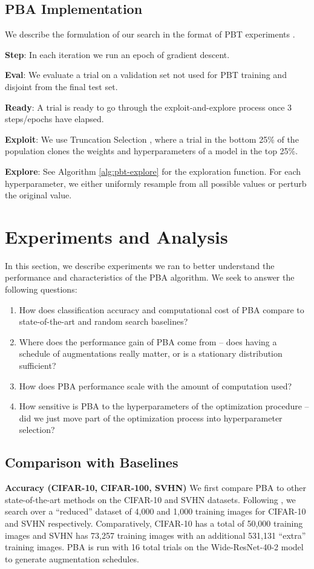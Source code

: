 \documentclass{article}
\begin{document}
%
 
\subsection{PBA Implementation}
We describe the formulation of our search in the format of PBT experiments \cite{pbt}.

\textbf{Step}: In each iteration we run an epoch of gradient descent.

\textbf{Eval}: We evaluate a trial on a validation set not used for PBT training and disjoint from the final test set.

\textbf{Ready}: A trial is ready to go through the exploit-and-explore process once 3 steps/epochs have elapsed.

\textbf{Exploit}: We use Truncation Selection \cite{pbt}, where a trial in the bottom 25\% of the population clones the weights and hyperparameters of a model in the top 25\%.

\textbf{Explore}: See Algorithm \ref{alg:pbt-explore} for the exploration function. For each hyperparameter, we either uniformly resample from all possible values or perturb the original value. 

\section{Experiments and Analysis}
\label{experiments}

In this section, we describe experiments we ran to better understand the performance and characteristics of the PBA algorithm. We seek to answer the following questions:

\begin{enumerate}
    \item How does classification accuracy and computational cost of PBA compare to state-of-the-art and random search baselines?
    \item Where does the performance gain of PBA come from -- does having a schedule of augmentations really matter, or is a stationary distribution sufficient?
    \item How does PBA performance scale with the amount of computation used?
    \item How sensitive is PBA to the hyperparameters of the optimization procedure -- did we just move part of the optimization process into hyperparameter selection?
\end{enumerate}


\subsection{Comparison with Baselines}
\textbf{Accuracy (CIFAR-10, CIFAR-100, SVHN)}
We first compare PBA to other state-of-the-art methods on the CIFAR-10 \cite{cifar} and SVHN \cite{svhn} datasets. Following \cite{autoaug}, we search over a ``reduced'' dataset of 4,000 and 1,000 training images for CIFAR-10 and SVHN respectively. Comparatively, CIFAR-10 has a total of 50,000 training images and SVHN has 73,257 training images with an additional 531,131 ``extra'' training images. PBA is run with 16 total trials on the Wide-ResNet-40-2 model to generate augmentation schedules.
\end{document}
